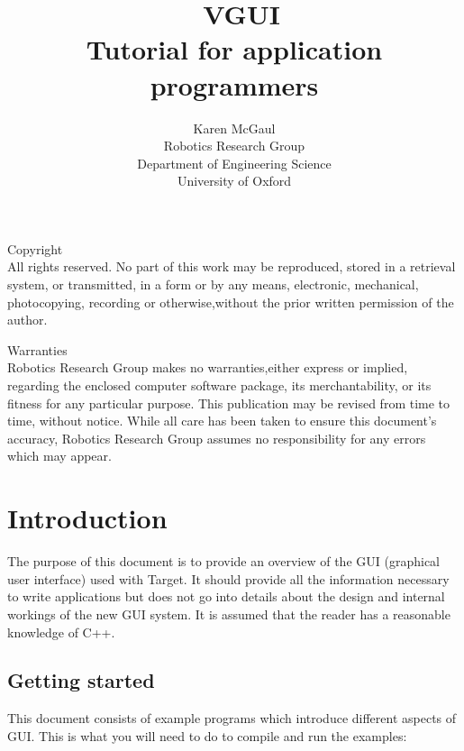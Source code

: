 \documentclass[12pt]{report}
\begin{document}
\title {\ VGUI \\ Tutorial for application programmers}

\author{Karen McGaul \\ Robotics Research Group \\ Department of
  Engineering Science\\ University of Oxford}

\maketitle
{}

{\sf\large Copyright} \\
All rights reserved. No part of this work may be reproduced, stored in
a retrieval system, or transmitted, in a form or by any means,
electronic, mechanical, photocopying, recording or otherwise,without
the prior written permission of the author.

\bigskip

{\sf\large Warranties} \\
Robotics Research Group makes no warranties,either express or implied,
regarding the enclosed computer software package, its merchantability,
or its fitness for any particular purpose. This publication may be
revised from time to time, without notice.
While all care has been taken to ensure this document's accuracy,
Robotics Research Group assumes no responsibility for any errors which
may appear.

\newpage
\tableofcontents
\newpage

\chapter{Introduction}

The purpose of this document is to provide an overview of the
GUI (graphical user interface) used with Target.  It should provide all the
information necessary to write applications but does not go into
details about the design and internal workings of the new GUI system.  It is
assumed that the reader has a reasonable knowledge of C++.

\section{Getting started}

This document consists of example programs which introduce different aspects of GUI.
This is what you will need to do to compile and run the examples:
\end{document}
